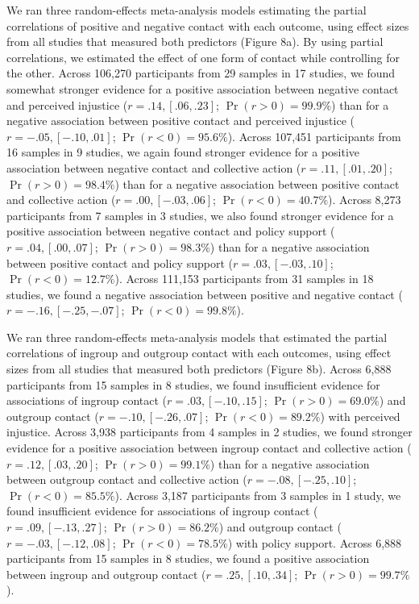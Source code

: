 \documentclass[12pt, letterpaper]{article}
\begin{document}
We ran three random-effects meta-analysis models estimating the partial
correlations of positive and negative contact with each outcome, using
effect sizes from all studies that measured both predictors (Figure 8a).
By using partial correlations, we estimated the effect of one form of
contact while controlling for the other. Across 106,270 participants
from 29 samples in 17 studies, we found somewhat stronger evidence for a
positive association between negative contact and perceived injustice
(\(r = .14, [.06, .23]\); \(\Pr (r > 0) = 99.9\%\)) than for a negative
association between positive contact and perceived injustice
(\(r = -.05, [-.10, .01]\); \(\Pr (r < 0) = 95.6\%\)). Across 107,451
participants from 16 samples in 9 studies, we again found stronger
evidence for a positive association between negative contact and
collective action (\(r = .11, [.01, .20]\); \(\Pr (r > 0) = 98.4\%\))
than for a negative association between positive contact and collective
action (\(r = .00, [-.03, .06]\); \(\Pr (r < 0) = 40.7\%\)). Across
8,273 participants from 7 samples in 3 studies, we also found stronger
evidence for a positive association between negative contact and policy
support (\(r = .04, [.00, .07]\); \(\Pr (r > 0) = 98.3\%\)) than for a
negative association between positive contact and policy support
(\(r = .03, [-.03, .10]\); \(\Pr (r < 0) = 12.7\%\)). Across 111,153
participants from 31 samples in 18 studies, we found a negative
association between positive and negative contact
(\(r = -.16, [-.25, -.07]\); \(\Pr (r < 0) = 99.8\%\)).

We ran three random-effects meta-analysis models that estimated the
partial correlations of ingroup and outgroup contact with each outcomes,
using effect sizes from all studies that measured both predictors
(Figure 8b). Across 6,888 participants from 15 samples in 8 studies, we
found insufficient evidence for associations of ingroup contact
(\(r = .03, [-.10, .15]\); \(\Pr (r > 0) = 69.0\%\)) and outgroup
contact (\(r = -.10, [-.26, .07]\); \(\Pr (r < 0) = 89.2\%\)) with
perceived injustice. Across 3,938 participants from 4 samples in 2
studies, we found stronger evidence for a positive association between
ingroup contact and collective action (\(r = .12, [.03, .20]\);
\(\Pr (r > 0) = 99.1\%\)) than for a negative association between
outgroup contact and collective action (\(r = -.08, [-.25, .10]\);
\(\Pr (r < 0) = 85.5\%\)). Across 3,187 participants from 3 samples in 1
study, we found insufficient evidence for associations of ingroup
contact (\(r = .09, [-.13, .27]\); \(\Pr (r > 0) = 86.2\%\)) and
outgroup contact (\(r = -.03, [-.12, .08]\); \(\Pr (r < 0) = 78.5\%\))
with policy support. Across 6,888 participants from 15 samples in 8
studies, we found a positive association between ingroup and outgroup
contact (\(r = .25, [.10, .34]\); \(\Pr (r > 0) = 99.7\%\)).
\end{document}
